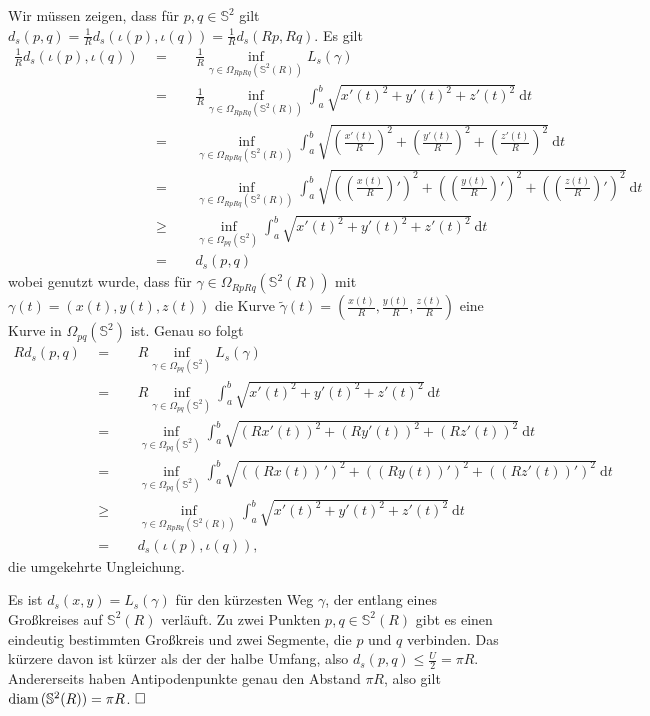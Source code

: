 \documentclass[11pt]{book}
\numberwithin{dummy}{section}
\theoremstyle{nonumberbreak}
\newenvironment{prob}[1][]{\ifthenelse{\equal{#1}{}}{\problem}{\problem[#1]}\rm}{\endproblem}
\newenvironment{sol}[1][]{\ifthenelse{\equal{#1}{}}{\solution}{\solution[#1]}\rm}{\endsolution}
\newcommand{\Sph}{\mathbb{S}}
\begin{document}
\begin{spacing}{1.4}
\begin{prob}
\begin{sol}
\begin{compactenum}
\item Wir müssen zeigen, dass für $p,q \in \Sph^2$ gilt $d_s(p,q)=\frac{1}{R} d_s(\iota(p), \iota(q)) = \frac{1}{R} d_s(Rp,Rq)$. Es gilt 
\begin{alignat*}{5}
\frac{1}{R} d_s(\iota(p),\iota(q)) \ \ &=&& \ \ \frac{1}{R} \inf_{\gamma \in \Omega_{Rp Rq}(\Sph^2(R))} L_s(\gamma) \\
&=&& \ \ \frac{1}{R} \inf_{\gamma \in \Omega_{RpRq}(\Sph^2(R))} \int_a^b \sqrt{x'(t)^2 + y'(t)^2 + z'(t)^2} \ \mathrm{d}t \\
&=&& \ \ \inf_{\gamma \in \Omega_{RpRq}(\Sph^2(R))} \int_a^b \sqrt{ \left(\frac{x'(t)}{R}\right)^2 + \left( \frac{y'(t)}{R}\right)^2 + \left( \frac{z'(t)}{R}\right)^2} \ \mathrm{d}t \\
&=&& \ \ \inf_{\gamma \in \Omega_{RpRq}(\Sph^2(R))} \int_a^b \sqrt{ \left(\left(\frac{x(t)}{R}\right)'\right)^2 + \left(\left( \frac{y(t)}{R}\right)'\right)^2 + \left(\left( \frac{z(t)}{R}\right)'\right)^2} \ \mathrm{d}t \\
&\geqslant&& \ \ \inf_{\gamma \in \Omega_{pq}(\Sph^2)} \int_a^b \sqrt{x'(t)^2 + y'(t)^2 + z'(t)^2} \ \mathrm{d}t \\
&=&& \ \ d_s(p,q)
\end{alignat*}
wobei genutzt wurde, dass für $\gamma \in \Omega_{RpRq}(\Sph^2(R))$ mit $\gamma(t)=(x(t),y(t),z(t))$ die Kurve $\tilde{\gamma}(t)=\left( \frac{x(t)}{R}, \frac{y(t)}{R}, \frac{z(t)}{R}\right)$ eine Kurve in $\Omega_{pq}(\Sph^2)$ ist. Genau so folgt
\begin{alignat*}{5}
R d_s(p,q) \ \ &=&& \ \ R \inf_{\gamma \in \Omega_{pq}(\Sph^2)} L_s(\gamma) \\
&=&& \ \ R \inf_{\gamma \in \Omega_{pq}(\Sph^2)} \int_a^b \sqrt{x'(t)^2+y'(t)^2 + z'(t)^2} \ \mathrm{d}t \\
&=&& \ \ \inf_{\gamma \in \Omega_{pq}(\Sph^2)} \int_a^b \sqrt{ (Rx'(t))^2 + (Ry'(t))^2 + (Rz'(t))^2} \ \mathrm{d}t \\
&=&& \ \  \inf_{\gamma \in \Omega_{pq}(\Sph^2)} \int_a^b \sqrt{ ((Rx(t))')^2 + ((Ry(t))')^2 + ((Rz'(t))')^2} \ \mathrm{d}t \\
&\geqslant && \ \ \inf_{\gamma \in \Omega_{RpRq}(\Sph^2(R))} \int_a^b \sqrt{x'(t)^2+y'(t)^2+z'(t)^2} \ \mathrm{d}t\\
&=&& \ \ d_s(\iota(p), \iota(q)),
\end{alignat*}
die umgekehrte Ungleichung.

\item Es ist $d_s(x,y)=L_s(\gamma)$ für den kürzesten Weg $\gamma$, der entlang eines Großkreises auf $\Sph^2(R)$ verläuft. Zu zwei Punkten $p,q\in \Sph^2(R)$ gibt es einen eindeutig bestimmten Großkreis und zwei Segmente, die $p$ und $q$ verbinden. Das kürzere davon ist kürzer als der der halbe Umfang, also $d_s(p,q) \leqslant \frac{U}{2}=\pi R$. Andererseits haben Antipodenpunkte genau den Abstand $\pi R$, also gilt $\mathrm{diam} \hspace{1.5pt} (\Sph^2(R)) = \pi R$. $\hfill \Box$


\end{compactenum}
\end{sol}
\end{prob}
\end{spacing}
\end{document}
